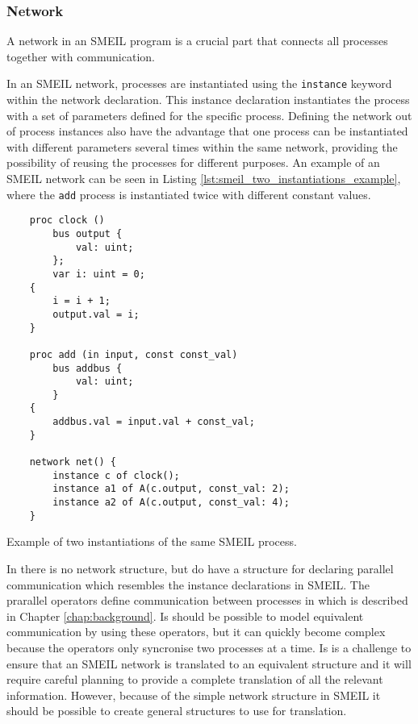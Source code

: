 \subsubsection{Network}
A network in an SMEIL program is a crucial part that connects all processes together with communication.

In an SMEIL network, processes are instantiated using the \texttt{instance} keyword within the network declaration. This instance declaration instantiates the process with a set of parameters defined for the specific process.
Defining the network out of process instances also have the advantage that one process can be instantiated with different parameters several times within the same network, providing the possibility of reusing the processes for different purposes. An example of an SMEIL network can be seen in Listing \ref{lst:smeil_two_instantiations_example}, where the \texttt{add} process is instantiated twice with different constant values.
\begin{listing}
    \begin{verbatim}
    proc clock ()
        bus output {
            val: uint;
        };
        var i: uint = 0;
    {
        i = i + 1;
        output.val = i;
    }

    proc add (in input, const const_val)
        bus addbus {
            val: uint;
        }
    {
        addbus.val = input.val + const_val;
    }

    network net() {
        instance c of clock();
        instance a1 of A(c.output, const_val: 2);
        instance a2 of A(c.output, const_val: 4);
    }
    \end{verbatim}
    \caption{Example of two instantiations of the same SMEIL process.}
    \label{lst:smeil_two_instantiations_example}
\end{listing}
In \cspm{} there is no network structure, but \cspm{} do have a structure for declaring parallel communication which resembles the instance declarations in SMEIL. The prarallel operators define communication between processes in \cspm{} which is described in Chapter \ref{chap:background}. Is should be possible to model equivalent communication by using these operators, but it can quickly become complex because the operators only syncronise two processes at a time. Is is a challenge to ensure that an SMEIL network is translated to an equivalent \cspm{} structure and it will require careful planning to provide a complete translation of all the relevant information. However, because of the simple network structure in SMEIL it should be possible to create general \cspm{} structures to use for translation.
